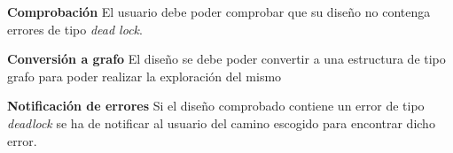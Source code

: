 	\item \textbf{Comprobación}\newline
		El usuario debe poder comprobar que su diseño no contenga errores de tipo \textit{dead lock}.
		\begin{functional}
			\item \textbf{Conversión a grafo}\newline
				El diseño se debe poder convertir a una estructura de tipo grafo para poder realizar la exploración del mismo
			\item \textbf{Notificación de errores}\newline
				Si el diseño comprobado contiene un error de tipo \textit{deadlock} se ha de notificar al usuario del camino
				escogido para encontrar dicho error.
		\end{functional}
